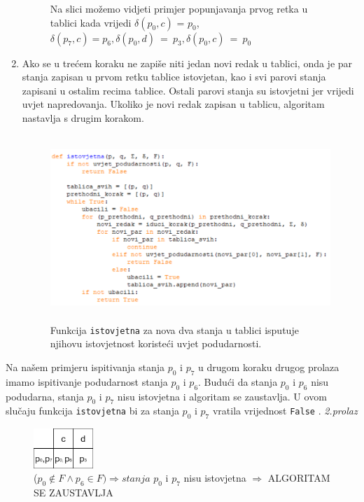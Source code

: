 \documentclass[titlepage]{article}
\begin{document}
\begin{enumerate}
\begin{figure}[h]
\caption{Na slici možemo vidjeti primjer popunjavanja prvog retka u tablici kada vrijedi
$\delta(p_0, c)$ = $p_0$, $\delta(p_7, c) = p_6, \delta(p_0, d)\ =\ p_3, \delta(p_0, c)\ =\ p_0$}
\end{figure}
\item Ako se u trećem koraku ne zapiše niti jedan novi redak u tablici, onda je par stanja zapisan u prvom retku tablice istovjetan, kao i svi parovi stanja zapisani u ostalim recima tablice. Ostali parovi stanja su istovjetni jer vrijedi uvjet napredovanja. 
\newline
Ukoliko je novi redak zapisan u tablicu, algoritam nastavlja s drugim korakom. 
\begin{figure}[h]
\centering
\includegraphics[height = 7cm]{2korak.png}
\caption{Funkcija \texttt{istovjetna} za nova dva stanja u tablici isputuje njihovu istovjetnost koristeći uvjet podudarnosti.}
\end{figure}
\end{enumerate}
\newpage
Na našem primjeru ispitivanja stanja $p_0$ i $p_7$ u drugom koraku drugog prolaza imamo ispitivanje podudarnost stanja $p_0$ i $p_6$. Budući da stanja $p_0$ i $p_6$ nisu podudarna, stanja $p_0$ i $p_7$ nisu istovjetna i algoritam se zaustavlja. U ovom slučaju funkcija \texttt{istovjetna} bi za stanja $p_0$ i $p_7$ vratila vrijednost \texttt{False} .
\newline \textit{2.prolaz }
\begin{figure}[h]
\centering
\includegraphics[width=0.2\textwidth, height= 1.5cm]{prviprolaz.jpg}
\caption{($p_0 \notin F \wedge p_6 \in F) \Rightarrow stanja$
\newline $p_0$ i $p_7$ nisu istovjetna $ \Rightarrow $ ALGORITAM SE ZAUSTAVLJA}
\end{figure}
\end{document}
